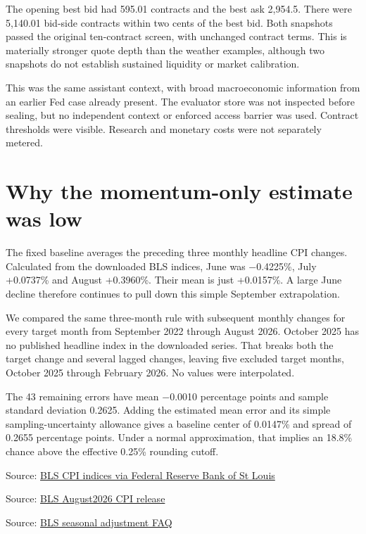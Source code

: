 \documentclass[11pt]{article}
\begin{document}
The opening best bid had 595.01 contracts and the best ask 2,954.5. There were 5,140.01 bid-side contracts within two cents of the best bid. Both snapshots passed the original ten-contract screen, with unchanged contract terms. This is materially stronger quote depth than the weather examples, although two snapshots do not establish sustained liquidity or market calibration.


This was the same assistant context, with broad macroeconomic information from an earlier Fed case already present. The evaluator store was not inspected before sealing, but no independent context or enforced access barrier was used. Contract thresholds were visible. Research and monetary costs were not separately metered.


\section*{\textcolor{epdarkgreen}{Why the momentum-only estimate was low}}
The fixed baseline averages the preceding three monthly headline CPI changes. Calculated from the downloaded BLS indices, June was −0.4225\%, July +0.0737\% and August +0.3960\%. Their mean is just +0.0157\%. A large June decline therefore continues to pull down this simple September extrapolation.


We compared the same three-month rule with subsequent monthly changes for every target month from September 2022 through August 2026. October 2025 has no published headline index in the downloaded series. That breaks both the target change and several lagged changes, leaving five excluded target months, October 2025 through February 2026. No values were interpolated.


The 43 remaining errors have mean −0.0010 percentage points and sample standard deviation 0.2625. Adding the estimated mean error and its simple sampling-uncertainty allowance gives a baseline center of 0.0147\% and spread of 0.2655 percentage points. Under a normal approximation, that implies an 18.8\% chance above the effective 0.25\% rounding cutoff.


\par{\small Source: \href{https://fred.stlouisfed.org/graph/fredgraph.csv?id=CPIAUCSL,CUSR0000SETB01,CUUR0000SETB01\&cosd=2021-08-01\&coed=2026-08-01}{BLS CPI indices via Federal Reserve Bank of St Louis}}
\par{\small Source: \href{https://www.bls.gov/news.release/cpi.nr0.htm}{BLS August2026 CPI release}}
\par{\small Source: \href{https://www.bls.gov/cpi/seasonal-adjustment/questions-and-answers.htm}{BLS seasonal adjustment FAQ}}
\end{document}
